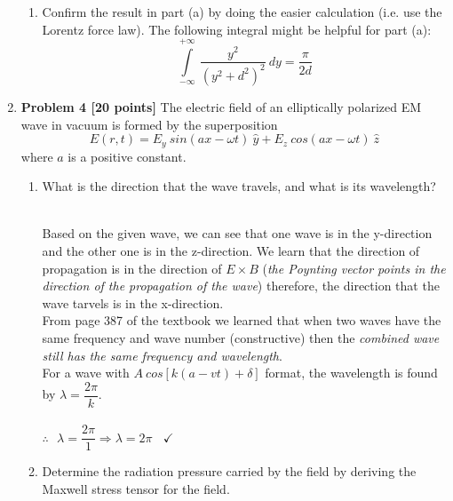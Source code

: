 \documentclass[fleqn]{article}
\begin{document}
\begin{enumerate}
\begin{enumerate}
      \item Confirm the result in part (a) by doing the easier calculation (i.e. use the Lorentz force law).
      The following integral might be helpful for part (a):
      $$
        \int\limits_{-\infty}^{+\infty} ~ \dfrac{y^2}{\left(y^2+d^2\right)^2} ~ dy=\dfrac{\pi}{2d} 
      $$


    \end{enumerate}

    \item \textbf{Problem 4 [20 points]} The electric field of an elliptically polarized EM wave in vacuum is formed by the superposition
      $$
        E(r,t)=E_y ~ sin(ax-\omega t) ~ \hat{y}+E_z ~ cos(ax-\omega t) ~ \hat{z}
      $$
      where $a$ is a positive constant.
      \begin{enumerate}
        \item What is the direction that the wave travels, and what is its wavelength?

          \textcolor{hwColor}{
            \\
            Based on the given wave, we can see that one wave is in the y-direction and the other one is in the z-direction. We learn that
            the direction of propagation is in the direction of $E \times B$ (\emph{the Poynting vector points in the direction of the propagation of the wave})
            therefore, the direction that the wave tarvels is in the x-direction.
            \\
            From page 387 of the textbook we learned that when two waves have the same frequency and wave number (constructive)
            then the \emph{combined wave still has the same frequency and wavelength}.
            \\
            For a wave with $A ~ cos\left[k\left(a-vt\right)+\delta\right]$ format, the wavelength is found by $\lambda=\dfrac{2\pi}{k}$.
            \\
            \\
            $
              \therefore ~~~ \lambda=\dfrac{2\pi}{1} \Longrightarrow \boxed{\lambda=2\pi} ~~~~ \checkmark
            $
          }

        \item Determine the radiation pressure carried by the field by deriving the Maxwell stress tensor for
        the field.


\end{enumerate}
\end{enumerate}
\end{document}
